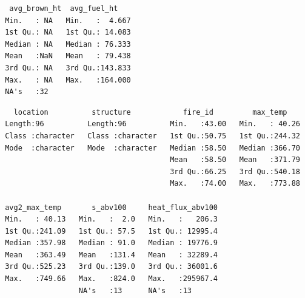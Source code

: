 \documentclass[11pt,a4paper]{article}
\begin{document}
\begin{verbatim}
  avg_brown_ht  avg_fuel_ht     
 Min.   : NA   Min.   :  4.667  
 1st Qu.: NA   1st Qu.: 14.083  
 Median : NA   Median : 76.333  
 Mean   :NaN   Mean   : 79.438  
 3rd Qu.: NA   3rd Qu.:143.833  
 Max.   : NA   Max.   :164.000  
 NA's   :32                     
\end{verbatim}

\begin{verbatim}
   location          structure            fire_id         max_temp     
 Length:96          Length:96          Min.   :43.00   Min.   : 40.26  
 Class :character   Class :character   1st Qu.:50.75   1st Qu.:244.32  
 Mode  :character   Mode  :character   Median :58.50   Median :366.70  
                                       Mean   :58.50   Mean   :371.79  
                                       3rd Qu.:66.25   3rd Qu.:540.18  
                                       Max.   :74.00   Max.   :773.88  
                                                                       
 avg2_max_temp       s_abv100     heat_flux_abv100  
 Min.   : 40.13   Min.   :  2.0   Min.   :   206.3  
 1st Qu.:241.09   1st Qu.: 57.5   1st Qu.: 12995.4  
 Median :357.98   Median : 91.0   Median : 19776.9  
 Mean   :363.49   Mean   :131.4   Mean   : 32289.4  
 3rd Qu.:525.23   3rd Qu.:139.0   3rd Qu.: 36001.6  
 Max.   :749.66   Max.   :824.0   Max.   :295967.4  
                  NA's   :13      NA's   :13        
\end{verbatim}
\end{document}
